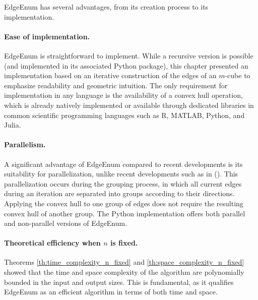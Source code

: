 EdgeEnum has several advantages, from its creation process to its implementation.

\paragraph*{Ease of implementation.} EdgeEnum is straightforward to implement. While a recursive version is possible (and implemented in its associated Python package), this chapter presented an implementation based on an iterative construction of the edges of an $m$-cube to emphasize readability and geometric intuition. The only requirement for implementation in any language is the availability of a convex hull operation, which is already natively implemented or available through dedicated libraries in common scientific programming languages such as R, MATLAB, Python, and Julia.

\paragraph*{Parallelism.} A significant advantage of EdgeEnum compared to recent developments is its suitability for parallelization, unlike recent developments such as in (\cite{guCounterfactualIdentificationLatent2022}). This parallelization occurs during the grouping process, in which all current edges during an iteration are separated into groups according to their directions. Applying the convex hull to one group of edges does not require the resulting convex hull of another group. The Python implementation offers both parallel and non-parallel versions of EdgeEnum.

\paragraph*{Theoretical efficiency when $n$ is fixed.} Theorems \ref{th:time_complexity_n_fixed} and \ref{th:space_complexity_n_fixed} showed that the time and space complexity of the algorithm are polynomially bounded in the input and output sizes. This is fundamental, as it qualifies EdgeEnum as an efficient algorithm in terms of both time and space. 


